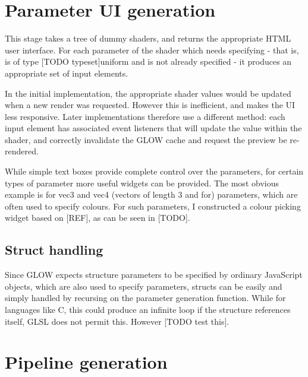 \documentclass[12pt,twoside,notitlepage]{report}
\begin{document}
\section{Parameter UI generation}
This stage takes a tree of dummy shaders, and returns the appropriate HTML user interface. For each parameter of the shader which needs specifying - that is, is of type [TODO typeset]uniform and is not already specified - it produces an appropriate set of input elements. 

In the initial implementation, the appropriate shader values would be updated when a new render was requested. However this is inefficient, and makes the UI less responsive. Later implementations therefore use a different method: each input element has associated event listeners that will update the value within the shader, and correctly invalidate the GLOW cache and request the preview be re-rendered.

While simple text boxes provide complete control over the parameters, for certain types of parameter more useful widgets can be provided. The most obvious example is for vec3 and vec4 (vectors of length 3 and for) parameters, which are often used to specify colours. For such parameters, I constructed a colour picking widget based on [REF], as can be seen in [TODO].

\subsection{Struct handling}
Since GLOW expects structure parameters to be specified by ordinary JavaScript objects, which are also used to specify parameters, structs can be easily and simply handled by recursing on the parameter generation function. While for languages like C, this could produce an infinite loop if the structure references itself, GLSL does not permit this. However [TODO test this].

\section{Pipeline generation}
\end{document}
